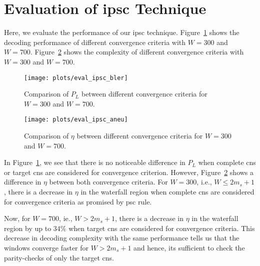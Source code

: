 \section{Evaluation of \texorpdfstring{\acrlong{ipsc}}{IPSC} Technique}
Here, we evaluate the performance of our \gls{ipsc} technique. Figure~\ref{fig:eval_ipsc_bler} shows the decoding performance of different convergence criteria with $W=300$ and $W=700$. Figure~\ref{fig:eval_ipsc_aneu} shows the complexity of different convergence criteria with $W=300$ and $W=700$.
\begin{figure}[htbp]
  \centering
  \texttt{[image: plots/eval\_ipsc\_bler]}
  \caption[Comparison of $P_L$ between different convergence criteria.]{Comparison of $P_L$ between different convergence criteria for $W=300$ and $W=700$.}
  \label{fig:eval_ipsc_bler}
\end{figure}
\begin{figure}[htbp]
  \centering
  \texttt{[image: plots/eval\_ipsc\_aneu]}
  \caption[Comparison of $\eta$ between different convergence criteria.]{Comparison of $\eta$ between different convergence criteria for $W=300$ and $W=700$.}
  \label{fig:eval_ipsc_aneu}
\end{figure}

In Figure~\ref{fig:eval_ipsc_bler}, we see that there is no noticeable difference in $P_L$ when complete \glspl{cn} or target \glspl{cn} are considered for convergence criterion. However, Figure~\ref{fig:eval_ipsc_aneu} shows a difference in $\eta$ between both convergence criteria. For $W=300$, i.e., $W\leq 2m_s+1$, there is a decrease in $\eta$ in the waterfall region when complete \glspl{cn} are considered for convergence criteria as promised by \gls{psc} rule.

Now, for $W=700$, ie., $W>2m_s+1$, there is a decrease in $\eta$ in the waterfall region by up to $34\%$ when target \glspl{cn} are considered for convergence criteria. This decrease in decoding complexity with the same performance tells us that the windows converge faster for $W>2m_s+1$ and hence, its sufficient to check the parity-checks of only the target \glspl{cn}.